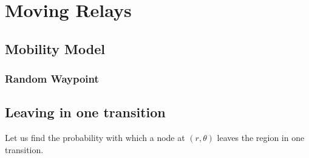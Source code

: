 \chapter{Moving Relays}
\section{Mobility Model}
\subsection{Random Waypoint}

\section{Leaving in  one transition}
Let us find the probability with which a node at $(r,\theta)$ leaves the region in 
one transition. 
